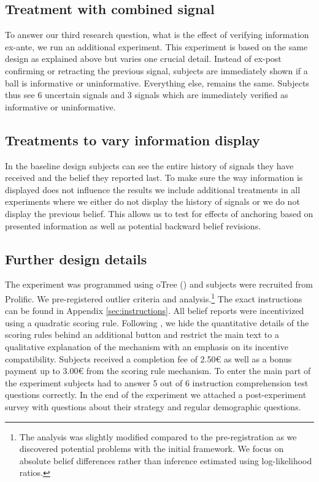 \documentclass{article}
\begin{document}
\subsection{Treatment with combined signal}

To answer our third research question, what is the effect of verifying information ex-ante, we run an additional experiment. This experiment is based on the same design as explained above but varies one crucial detail. Instead of ex-post confirming or retracting the previous signal, subjects are immediately shown if a ball is informative or uninformative. Everything else, remains the same. Subjects thus see 6 uncertain signals and 3 signals which are immediately verified as informative or uninformative.


\subsection{Treatments to vary information display}

In the baseline design subjects can see the entire history of signals they have received and the belief they reported last. To make sure the way information is displayed does not influence the results we include additional treatments in all experiments where we either do not display the history of signals or we do not display the previous belief. This allows us to test for effects of anchoring based on presented information as well as potential backward belief revisions.


\subsection{Further design details}

The experiment was programmed using oTree (\cite{Chen2016}) and subjects were recruited from Prolific. We pre-registered outlier criteria and analysis.\footnote{The analysis was slightly modified compared to the pre-registration as we discovered potential problems with the initial framework. We focus on absolute belief differences rather than inference estimated using log-likelihood ratios.} The exact instructions can be found in Appendix \ref{sec:instructions}. All belief reports were incentivized using a quadratic scoring rule. Following \cite{Danz2020}%
, we hide the quantitative details of the scoring rules behind an additional button and restrict the main text to a qualitative explanation of the mechanism with an emphasis on its incentive compatibility. Subjects received a completion fee of 2.50\euro\xspace as well as a bonus payment up to 3.00\euro\xspace from the scoring rule mechanism. To enter the main part of the experiment subjects had to answer 5 out of 6 instruction comprehension test questions correctly. In the end of the experiment we attached a post-experiment survey with questions about their strategy and regular demographic questions. 
\end{document}
